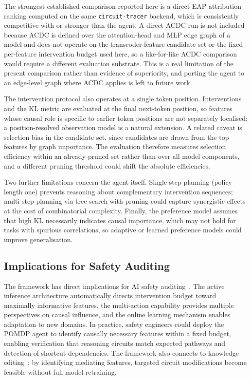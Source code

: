  The strongest established comparison reported here is a direct EAP attribution
ranking computed on the same \texttt{circuit-tracer} backend, which is consistently
competitive with or stronger than the agent. A direct ACDC run is not included
because ACDC is defined over the attention-head and MLP edge graph of a model and does
not operate on the transcoder-feature candidate set or the fixed per-feature
intervention budget used here, so a like-for-like ACDC comparison would require a
different evaluation substrate. This is a real limitation of the present comparison
rather than evidence of superiority, and porting the agent to an edge-level graph
where ACDC applies is left to future work.

The intervention protocol also operates at a single token position. Interventions and
the KL metric are evaluated at the final next-token position, so features whose causal
role is specific to earlier token positions are not separately localised; a
position-resolved observation model is a natural extension. A related caveat is
selection bias in the candidate set, since candidates are drawn from the top features
by graph importance. The evaluation therefore measures selection efficiency within an
already-pruned set rather than over all model components, and a different pruning
threshold could shift the absolute efficiencies.

Two further limitations concern the agent itself. Single-step planning (policy length
one) prevents reasoning about complementary intervention sequences; multi-step
planning via tree search with pruning could capture synergistic effects at the cost of
combinatorial complexity. Finally, the preference model assumes that high KL
necessarily indicates causal importance, which may not hold for tasks with spurious
correlations, so adaptive or learned preference models could improve generalisation.

\subsection{Implications for Safety Auditing}

The \ACD{} framework has direct implications for AI safety auditing~\cite{Hubinger2019}. The active inference architecture automatically directs intervention budget toward maximally informative features, the multi-action capability provides multiple perspectives on causal influence, and the online learning mechanism enables adaptation to new domains. In practice, safety engineers could deploy the POMDP agent to identify causally necessary features within a fixed budget, enabling verification that reasoning circuits match expected pathways and detection of shortcut dependencies. The framework also connects to knowledge editing~\cite{Meng2022}: by identifying mediating features, targeted circuit modifications become feasible without full model retraining.

